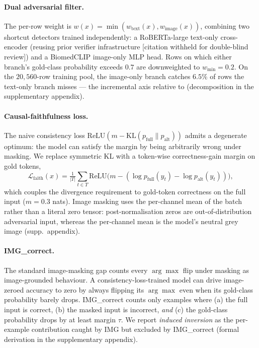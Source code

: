 \documentclass{article}
\begin{document}
\paragraph{Dual adversarial filter.} The per-row weight is
$w(x) = \min(w_{\text{text}}(x), w_{\text{image}}(x))$, combining
two shortcut detectors trained independently: a RoBERTa-large
text-only cross-encoder (reusing prior verifier infrastructure
[citation withheld for double-blind review]) and a BiomedCLIP
\citep{zhang2024biomedclip} image-only MLP head. Rows on which
either branch's gold-class probability exceeds $0.7$ are
downweighted to $w_{\min} = 0.2$. On the $20{,}560$-row training
pool, the image-only branch catches $6.5\%$ of rows the text-only
branch misses --- the incremental axis relative to
\citet{li2025sfc} (decomposition in the supplementary appendix).

\paragraph{Causal-faithfulness loss.} The naive consistency loss
$\mathrm{ReLU}(m - \mathrm{KL}(p_{\mathrm{full}}\|p_{\mathrm{alt}}))$
admits a degenerate optimum: the model can satisfy the margin by
being arbitrarily wrong under masking. We replace symmetric KL with
a token-wise correctness-gain margin on gold tokens,
\begin{equation}
\mathcal{L}_{\mathrm{faith}}(x) =
\tfrac{1}{|T|}\!\sum_{t \in T}\mathrm{ReLU}\!\bigl(m -
(\log p_{\mathrm{full}}(y_t) - \log p_{\mathrm{alt}}(y_t))\bigr),
\end{equation}
which couples the divergence requirement to gold-token correctness
on the full input ($m = 0.3$ nats). Image masking uses the
per-channel mean of the batch rather than a literal zero tensor:
post-normalisation zeros are out-of-distribution adversarial input,
whereas the per-channel mean is the model's neutral grey image
(supp.\ appendix).

\paragraph{IMG\_correct.} The standard image-masking gap counts
every $\arg\max$ flip under masking as image-grounded behaviour. A
consistency-loss-trained model can drive image-zeroed accuracy to
zero by always flipping its $\arg\max$ even when its gold-class
probability barely drops. IMG\_correct counts only examples where
(a) the full input is correct, (b) the masked input is incorrect,
\emph{and} (c) the gold-class probability drops by at least margin
$\tau$. We report \emph{induced inversion} as the per-example
contribution caught by IMG but excluded by IMG\_correct (formal
derivation in the supplementary appendix).
\end{document}
